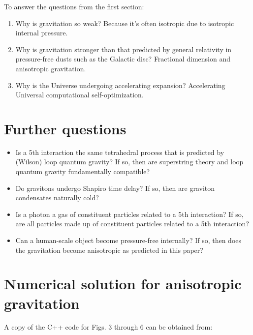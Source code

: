 \documentclass[12pt]{article}
\begin{document}
To answer the questions from the first section:
\begin{enumerate}
\item Why is gravitation so weak? 
Because it's often isotropic due to isotropic internal pressure.
\item Why is gravitation stronger than that predicted by general relativity in pressure-free dusts such as the Galactic disc? 
Fractional dimension and anisotropic gravitation.
\item Why is the Universe undergoing accelerating expansion? 
Accelerating Universal computational self-optimization.
\end{enumerate}









\section{Further questions}
\begin{itemize}
\item Is a 5th interaction the same tetrahedral process that is predicted by (Wilson) loop quantum gravity?
If so, then are superstring theory and loop quantum gravity fundamentally compatible?
\item Do gravitons undergo Shapiro time delay?
If so, then are graviton condensates naturally cold?
\item Is a photon a gas of constituent particles related to a 5th interaction?
If so, are all particles made up of constituent particles related to a 5th interaction?
\item Can a human-scale object become pressure-free internally? 
If so, then does the gravitation become anisotropic as predicted in this paper?
\end{itemize}




\section{Numerical solution for anisotropic gravitation}

A copy of the C++ code for Figs. 3 through 6 can be obtained from:
\end{document}
